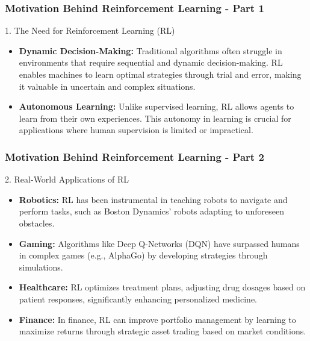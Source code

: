 \documentclass[aspectratio=169]{beamer}
\begin{document}
\begin{frame}[fragile]
    \frametitle{Motivation Behind Reinforcement Learning - Part 1}
    \begin{block}{1. The Need for Reinforcement Learning (RL)}
        \begin{itemize}
            \item \textbf{Dynamic Decision-Making:} 
            Traditional algorithms often struggle in environments that require sequential and dynamic decision-making. RL enables machines to learn optimal strategies through trial and error, making it valuable in uncertain and complex situations.
            
            \item \textbf{Autonomous Learning:}
            Unlike supervised learning, RL allows agents to learn from their own experiences. This autonomy in learning is crucial for applications where human supervision is limited or impractical.
        \end{itemize}
    \end{block}
\end{frame}

\begin{frame}[fragile]
    \frametitle{Motivation Behind Reinforcement Learning - Part 2}
    \begin{block}{2. Real-World Applications of RL}
        \begin{itemize}
            \item \textbf{Robotics:}
            RL has been instrumental in teaching robots to navigate and perform tasks, such as Boston Dynamics' robots adapting to unforeseen obstacles.
            
            \item \textbf{Gaming:}
            Algorithms like Deep Q-Networks (DQN) have surpassed humans in complex games (e.g., AlphaGo) by developing strategies through simulations.
            
            \item \textbf{Healthcare:}
            RL optimizes treatment plans, adjusting drug dosages based on patient responses, significantly enhancing personalized medicine.
            
            \item \textbf{Finance:}
            In finance, RL can improve portfolio management by learning to maximize returns through strategic asset trading based on market conditions.
        \end{itemize}
    \end{block}
\end{frame}
\end{document}
